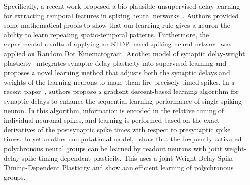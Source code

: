\documentclass[brainsci, %
               review,submit,pdftex,moreauthors%
               ]{Definitions/mdpi}
\begin{document}
Specifically, a recent work proposed a bio-plausible unsupervised delay learning for extracting temporal features in spiking neural networks~\citep{nadafian_bio-plausible_2020}. Authors provided some mathematical proofs to show that our learning rule gives a neuron the ability to learn repeating spatio-temporal patterns. Furthermore, the experimental results of applying an STDP-based spiking neural network was applied on Random Dot Kinematogram. Another model of synaptic delay-weight plasticity~\citep{zhang_supervised_2020} integrates synaptic delay plasticity into supervised learning and proposes a novel learning method that adjusts both the synaptic delays and weights of the learning neurons to make them fire precisely timed spikes. %
In a recent paper~\citep{luo_supervised_2022}, authors propose a gradient descent-based learning algorithm for synaptic delays to enhance the sequential learning performance of single spiking neuron. In this algorithm, information is encoded in the relative timing of individual neuronal spikes, and learning is performed based on the exact derivatives of the postsynaptic spike times with respect to presynaptic spike times.
In yet another computational model,~\citet{sun_learning_2016} show that the frequently activated polychronous neural groups can be learned by readout neurons with joint weight-delay spike-timing-dependent plasticity. This uses a joint Weight-Delay Spike-Timing-Dependent Plasticity and show aan efficient learning of polychronous groups.

\end{document}
